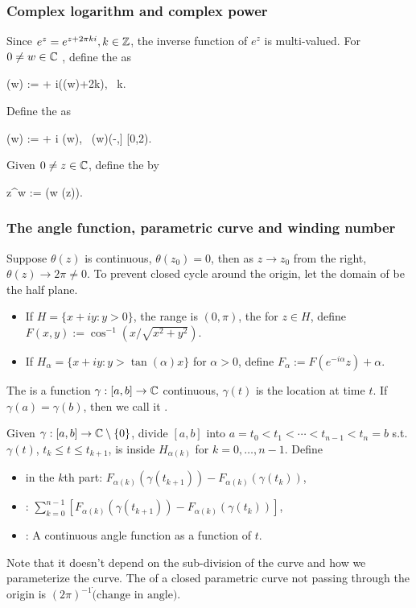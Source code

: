 \documentclass[10pt,a4paper]{book}
\begin{document}
\subsubsection{Complex logarithm and complex power}
Since $e^{z}=e^{z+2\pi ki}, k\in\mathbb Z$, the inverse function of $e^z$ is multi-valued. For $0\neq w\in\mathbb C$ , define the  as 
\begin{sequation*}
	\log (w) := \log{} + i(\arg(w)+2\pi k), \ k\in\bbZ.
\end{sequation*} 
Define the  as 
\begin{sequation*}
	\Log (w) := \log {} + i \arg(w), \ \arg(w)\in (-\pi,\pi]  [0,2\pi).
\end{sequation*}
Given $0\neq z\in\mathbb C$, define the  by 
\begin{sequation*}
	z^w := \exp(w \log(z)).
\end{sequation*} 

\subsubsection{The angle function, parametric curve and winding number}
Suppose $\theta(z)$ is continuous, $\theta(z_0)=0$, then as $z\to z_0$ from the right, $\theta(z)\to 2\pi\neq 0$. 
To prevent closed cycle around the origin, let the domain of  be the half plane. 
\begin{itemize}
	\item If $H=\{x+iy:y>0\}$, the range is $(0,\pi)$, the for $z\in H$, define $F(x,y) := \cos^{-1}({x}/{\sqrt{x^2+y^2}})$.
	\item If $H_\alpha=\{x+iy: y>\tan(\alpha) x\}$ for $\alpha>0$, define $F_\alpha := F(e^{-i\alpha}z)+\alpha$.     
\end{itemize}    

The  is a function $\gamma:[a,b]\to\mathbb C$ continuous, $\gamma(t)$ is the location at time $t$.
If $\gamma(a)=\gamma(b)$, then we call it .    

Given $\gamma:[a,b]\to \mathbb C\setminus\{0\}$, divide $[a,b]$ into $a=t_0<t_1<\cdots<t_{n-1}<t_n =b$ s.t. $\gamma(t)$, $t_k\leq t\leq t_{k+1}$, is inside $H_{\alpha(k)}$ for $k=0,\ldots,n-1$.
Define 
\begin{itemize}
	\item {} in the $k$th part: $F_{\alpha(k)}(\gamma(t_{k+1}))-F_{\alpha(k)}(\gamma(t_k))$, 
	\item {}: $\sum_{k=0}^{n-1}[F_{\alpha(k)}(\gamma(t_{k+1}))-F_{\alpha(k)}(\gamma(t_k))]$,
	\item {}: A continuous angle function as a function of $t$. 
\end{itemize}
Note that it doesn't depend on the sub-division of the curve and how we parameterize the curve.
The  of a closed parametric curve not passing through the origin is $(2\pi)^{-1}\dot(\text{change in angle})$. 
\end{document}
